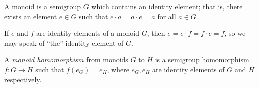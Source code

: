 \documentclass[12pt]{article}
\begin{document}
A monoid is a semigroup $G$ which contains an identity element; that is, there exists an element $e \in G$ such that $e \cdot a = a \cdot e = a$ for all $a \in G$.

If $e$ and $f$ are identity elements of a monoid $G$, then $e=e\cdot f=f\cdot e=f$, so we may speak of ``the'' identity element of $G$.

A \emph{monoid homomorphism} from monoids $G$ to $H$ is a semigroup homomorphism $f:G\to H$ such that $f(e_G)=e_H$, where $e_G,e_H$ are identity elements of $G$ and $H$ respectively.

\end{document}
